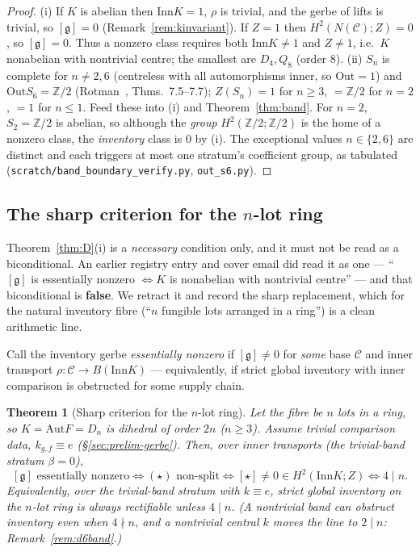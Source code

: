 \documentclass[11pt]{article}
\newtheorem{theorem}{Theorem}
\theoremstyle{definition}
\newcommand{\C}{\mathcal{C}}
\newcommand{\Z}{\mathbb{Z}}
\newcommand{\Aut}{\mathrm{Aut}}
\newcommand{\Inn}{\mathrm{Inn}}
\newcommand{\Out}{\mathrm{Out}}
\newcommand{\Zc}{Z}
\newcommand{\gerbe}{\mathfrak{g}}
\begin{document}
\begin{proof}
(i) If $K$ is abelian then $\Inn K=1$, $\rho$ is trivial, and the gerbe of lifts is trivial, so
$[\gerbe]=0$ (Remark~\ref{rem:kinvariant}). If $\Zc=1$ then $H^2(N(\C);\Zc)=0$, so $[\gerbe]=0$. Thus
a nonzero class requires both $\Inn K\ne1$ and $\Zc\ne1$, i.e.\ $K$ nonabelian with nontrivial
centre; the smallest are $D_4,Q_8$ (order $8$). (ii) $S_n$ is complete for $n\ne2,6$
(centreless with all automorphisms inner, so $\Out=1$) and $\Out S_6=\Z/2$ (Rotman~\cite{rotman},
Thms.\ 7.5--7.7); $\Zc(S_n)=1$ for $n\ge3$, $=\Z/2$ for $n=2$, $=1$ for $n\le1$. Feed these into
(i) and Theorem~\ref{thm:band}. For $n=2$, $S_2=\Z/2$ is abelian, so although the \emph{group}
$H^2(\Z/2;\Z/2)$ is the home of a nonzero class, the \emph{inventory} class is $0$ by (i). The
exceptional values $n\in\{2,6\}$ are distinct and each triggers at most one stratum's coefficient
group, as tabulated (\texttt{scratch/band\_boundary\_verify.py}, \texttt{out\_s6.py}).
\end{proof}

\subsection{The sharp criterion for the $n$-lot ring}\label{sec:dsharp}

Theorem~\ref{thm:D}(i) is a \emph{necessary} condition only, and it must not be read as a
biconditional. An earlier registry entry and cover email did read it as one --- ``$[\gerbe]$ is
essentially nonzero $\iff K$ is nonabelian with nontrivial centre'' --- and that biconditional is
\textbf{false}. We retract it and record the sharp replacement, which for the natural inventory
fibre (``$n$ fungible lots arranged in a ring'') is a clean arithmetic line.

Call the inventory gerbe \emph{essentially nonzero} if $[\gerbe]\ne0$ for \emph{some} base $\C$ and
inner transport $\rho:\C\to B(\Inn K)$ --- equivalently, if strict global inventory with inner
comparison is obstructed for some supply chain.

\begin{theorem}[Sharp criterion for the $n$-lot ring]\label{thm:Dsharp}
Let the fibre be $n$ lots in a ring, so $K=\Aut F=D_n$ is dihedral of order $2n$ \textup{($n\ge3$)}.
Assume trivial comparison data, $k_{g,f}\equiv e$ (\S\ref{sec:prelim-gerbe}). Then, over inner
transports (the trivial-band stratum $\beta=0$),
\[
[\gerbe]\text{ essentially nonzero}\iff(\star)\text{ non-split}\iff[\star]\ne0\in H^2(\Inn K;\Zc)
\iff 4\mid n.
\]
Equivalently, over the trivial-band stratum with $k\equiv e$, strict global inventory on the $n$-lot
ring is \emph{always} rectifiable unless $4\mid n$. (A nontrivial band can obstruct inventory even
when $4\nmid n$, and a nontrivial central $k$ moves the line to $2\mid n$: Remark~\ref{rem:d6band}.)
\end{theorem}
\end{document}
